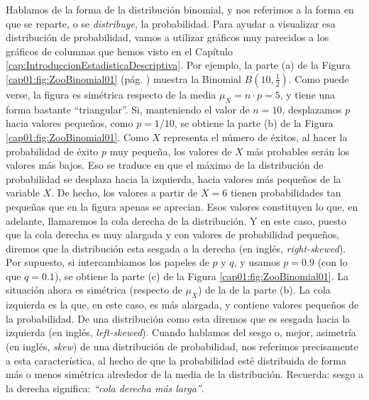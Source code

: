 Hablamos de la forma de la distribución binomial, y nos referimos a la forma en que se reparte, o
se {\em distribuye}, la probabilidad. Para ayudar a visualizar esa distribución de probabilidad,
vamos a utilizar gráficos muy parecidos a los gráficos de columnas que hemos visto en el Capítulo
\ref{cap:IntroduccionEstadisticaDescriptiva}. Por ejemplo, la parte (a) de la Figura
\ref{cap01:fig:ZooBinomial01} (pág. \pageref{cap01:fig:ZooBinomial01}) muestra la Binomial
$B(10,\frac{1}{2})$. Como puede verse, la figura es simétrica respecto de la media $\mu_X=n\cdot
p=5$, y tiene una forma bastante ``triangular''.  Si, manteniendo el valor de $n=10$, desplazamos
$p$ hacia valores pequeños, como $p=1/10$, se obtiene la parte (b) de la Figura
\ref{cap01:fig:ZooBinomial01}.  Como $X$ representa el número de éxitos, al hacer la probabilidad
de éxito $p$ muy pequeña, los valores de $X$ más probables serán los valores más bajos. Eso se
traduce en que el máximo de la distribución de probabilidad se desplaza hacia la izquierda, hacia
valores más pequeños de la variable $X$. De hecho, los valores a partir de $X=6$ tienen
probabilidades tan pequeñas que en la figura apenas se aprecian. Esos valores constituyen lo que,
en adelante, llamaremos la {\sf cola derecha} de la distribución. Y en este caso, puesto que la cola derecha es muy alargada y
con valores de probabilidad pequeños, diremos que la distribución esta {\sf sesgada a la
derecha} (en inglés, {\em
right-skewed}). Por supuesto, si intercambiamos los papeles de $p$ y $q$, y
usamos $p=0.9$ (con lo que $q=0.1$), se obtiene la parte (c) de la Figura
\ref{cap01:fig:ZooBinomial01}. La situación ahora es simétrica (respecto de $\mu_X$) de la de la
parte (b). La {\sf cola izquierda} es la que, en este caso, es más alargada, y contiene valores
pequeños de la probabilidad. De una distribución como esta diremos que es sesgada hacia la
izquierda (en  inglés, {\em left-skewed}). Cuando hablamos del {\sf sesgo} o, mejor, {\sf
asimetría} (en inglés, {\em skew}) de una distribución de
probabilidad, nos referimos precisamente a esta característica, al hecho de que la probabilidad
esté distribuida de forma más o menos simétrica alrededor de la media de la distribución. Recuerda: sesgo a la derecha significa: {\em ``cola derecha más larga''}. 


